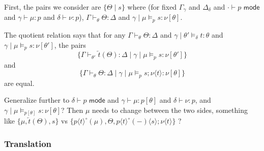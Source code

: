 \documentclass[10pt]{article}
\theoremstyle{definition}
\newcommand{\yields}{\vdash}
\newcommand{\type}{\,\,\mathsf{mode}}
\newcommand{\rewrite}[2]{\overleftarrow{#1}(#2)}
\newcommand\TermTwoT[5]{\ensuremath{#1 \mid #3 \vDash_{#5} #2 : #4}}
\newcommand\TrCirc[2]{\ensuremath{{#1}^\circ(#2)}}
\newcommand\var[1]{\ensuremath{\mathsf{var}_{#1}}}
\newcommand{\id}{\mathsf{id}}
\newcommand\ApEl[2]{\mathcal{T}_{#1}\langle#2\rangle}
\newcommand\ap[2]{\ensuremath{#1 \langle #2 \rangle }}
\begin{document}

  First, the pairs we consider are $\{ \Theta \mid s \}$ where (for fixed
  $\Gamma_\gamma$ and $\Delta_\delta$ and $\cdot \yields p \type$ and
  $\gamma \yields \mu : p$ and $\delta \yields \nu : p$), $\Gamma
  \yields_\theta \Theta : \Delta$ and
  $\TermTwoT{\gamma}{s}{\mu}{\nu[\theta]}{p}$.

  The quotient relation says that for any
  $\Gamma
  \yields_\theta \Theta : \Delta$ and
  $\TermTwoT{\gamma}{t}{\theta'}{\theta}{\delta}$
  and 
  $\TermTwoT{\gamma}{s}{\mu}{\nu[\theta']}{p}$, the pairs
  \[
  \{ \Gamma \yields_{\theta'} \rewrite{t}{\Theta} : \Delta \mid
  \TermTwoT{\gamma}{s}{\mu}{\nu[\theta']}{p}
  \}
  \]
  and
  \[
  \{ \Gamma \yields_{\theta} {\Theta} : \Delta \mid
  \TermTwoT{\gamma}{s;\ap{\nu}{t}}{\mu}{\nu[\theta]}{p}
  \}
  \]
  are equal.

  Generalize further to
    $\delta \yields p \type$ and
    $\gamma \yields \mu : p[\theta]$ and $\delta \yields \nu : p$, and
    $\TermTwoT{\gamma}{s}{\mu}{\nu[\theta]}{p[\theta]}$?
    Then $\mu$ needs to change between the two sides, something like
    $\{ \mu, \rewrite{t}{\Theta}, s \}$
    vs
    $\{ \TrCirc{\ap{p}{t}}{\mu}, \Theta,
    \ap{\TrCirc{\ap{p}{t}}{-}}{s};\ap{\nu}{t} \}$ ?
    
\subsubsection{Translation}

\end{document}
